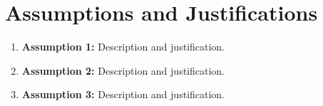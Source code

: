 \section{Assumptions and Justifications}

\begin{enumerate}[label=\textbf{A\arabic*},leftmargin=*]
  \item \textbf{Assumption 1:} Description and justification.
  \item \textbf{Assumption 2:} Description and justification.
  \item \textbf{Assumption 3:} Description and justification.
\end{enumerate}
